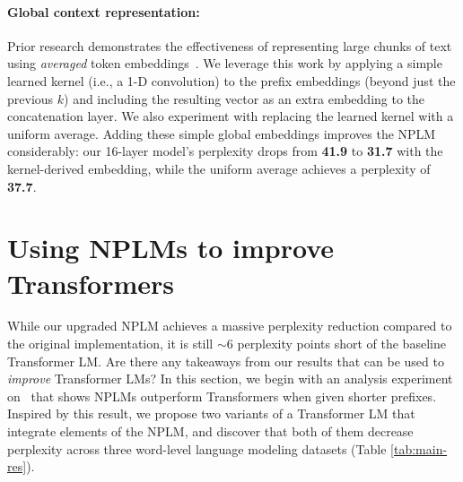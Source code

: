 \documentclass[11pt]{article}
\begin{document}
\paragraph{Global context representation:} Prior research demonstrates the effectiveness of representing large chunks of text using \emph{averaged} token embeddings~\citep{iyyer-etal-2015-deep,wieting2015towards}. We leverage this work by applying a simple learned kernel (i.e., a 1-D convolution) to the prefix embeddings (beyond just the previous $k$) and including the resulting vector as an extra embedding
to the concatenation layer. We also experiment with replacing the learned kernel with a uniform average. Adding these simple global embeddings improves the NPLM considerably: our 16-layer model's perplexity drops from \textbf{41.9} to \textbf{31.7} with the kernel-derived embedding, while the uniform average achieves a perplexity of \textbf{37.7}. 






















 


\section{Using NPLMs to improve Transformers}

While our upgraded NPLM achieves a massive perplexity reduction compared to the original implementation, it is still $\sim 6$ perplexity points short of the baseline Transformer LM. Are there any takeaways from our results that can be used to \emph{improve} Transformer LMs? In this section, we begin with an analysis experiment on \wtthree\ that shows NPLMs outperform Transformers when given shorter prefixes. Inspired by this result, we propose two variants of a Transformer LM that integrate elements of the NPLM, and discover that both of them decrease perplexity across three word-level language modeling datasets (Table \ref{tab:main-res}). 
\end{document}
